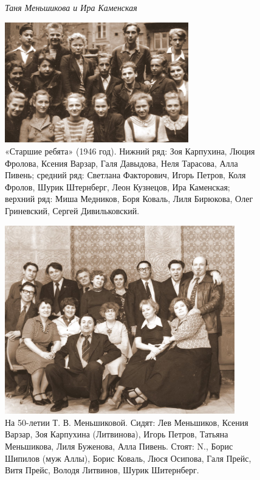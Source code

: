 \begin{figure}
\begin{minipage}[h!]{25mm}
        \begin{footnotesize}\textit{Таня Меньшикова и Ира Каменская}\end{footnotesize}
    \end{minipage}
\end{figure}

\begin{figure}[h!]
    \includegraphics[width=80mm]{inc/15/4}
    \caption{«Старшие ребята» (1946 год). Нижний ряд: Зоя Карпухина, Люция Фролова, Ксения Варзар, Галя Давыдова, Неля Тарасова, Алла Пивень; средний ряд: Светлана Факторович, Игорь Петров, Коля Фролов, Шурик Штернберг, Леон Кузнецов, Ира Каменская; верхний ряд: Миша Медников, Боря Коваль, Лиля Бирюкова, Олег Гриневский, Сергей Дивильковский. }
\end{figure}

\begin{figure}[ht]
    \includegraphics[width=100mm]{inc/16/1}
    \caption{На 50-летии Т. В. Меньшиковой. Сидят: Лев Меньшиков, Ксения Варзар, Зоя Карпухина (Литвинова), Игорь Петров, Татьяна Меньшикова, Лиля Буженова, Алла Пивень. Стоят: N., Борис Шипилов (муж Аллы), Борис Коваль, Люся Осипова, Галя Прейс, Витя Прейс, Володя Литвинов, Шурик Шитернберг.}
\end{figure}

